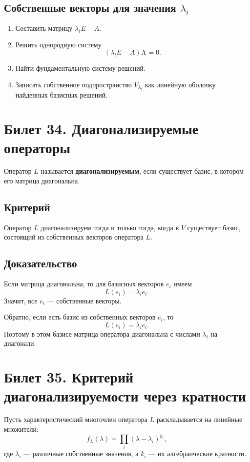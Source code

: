 \documentclass[12pt,a4paper]{article}
\begin{document}
\subsection*{Собственные векторы для значения $\lambda_i$}

\begin{enumerate}
    \item Составить матрицу $\lambda_iE-A$.
    \item Решить однородную систему
    \[
        (\lambda_iE-A)X=0.
    \]
    \item Найти фундаментальную систему решений.
    \item Записать собственное подпространство $V_{\lambda_i}$ как линейную оболочку найденных базисных решений.
\end{enumerate}

\section{Билет 34. Диагонализируемые операторы}

Оператор $L$ называется \textbf{диагонализируемым}, если существует базис, в котором его матрица диагональна.

\subsection*{Критерий}

Оператор $L$ диагонализируем тогда и только тогда, когда в $V$ существует базис, состоящий из собственных векторов оператора $L$.

\subsection*{Доказательство}

Если матрица диагональна, то для базисных векторов $e_i$ имеем
\[
    L(e_i)=\lambda_i e_i.
\]
Значит, все $e_i$ --- собственные векторы.

Обратно, если есть базис из собственных векторов $e_i$, то
\[
    L(e_i)=\lambda_i e_i.
\]
Поэтому в этом базисе матрица оператора диагональна с числами $\lambda_i$ на диагонали.

\section{Билет 35. Критерий диагонализируемости через кратности}

Пусть характеристический многочлен оператора $L$ раскладывается на линейные множители:
\[
    f_L(\lambda)=\prod_i(\lambda-\lambda_i)^{k_i},
\]
где $\lambda_i$ --- различные собственные значения, а $k_i$ --- их алгебраические кратности.
\end{document}
